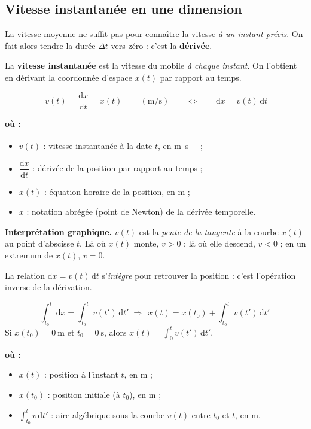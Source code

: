 \documentclass[11pt,a4paper]{article}
\newenvironment{ou}{%
  \par\smallskip\noindent\textbf{où :}\nopagebreak
  \begin{itemize}[leftmargin=1.8em,topsep=2pt,itemsep=1.5pt,parsep=0pt]}%
  {\end{itemize}}
\newcommand{\dd}{\mathrm{d}}
\newcommand{\ms}{\si{\metre\per\second}}
\begin{document}
\subsection{Vitesse instantanée en une dimension}

La vitesse moyenne ne suffit pas pour connaître la vitesse \emph{à un instant précis}.
On fait alors tendre la durée $\Delta t$ vers zéro : c'est la \textbf{dérivée}.

\begin{definition}
La \textbf{vitesse instantanée} est la vitesse du mobile \emph{à chaque instant}. On l'obtient
en dérivant la coordonnée d'espace $x(t)$ par rapport au temps.
\end{definition}

\begin{formule}
\[ \boxed{\,v(t)=\dfrac{\dd x}{\dd t}=\dot{x}(t)\,}\qquad(\ms)
   \qquad\Longleftrightarrow\qquad \dd x = v(t)\,\dd t \]
\begin{ou}
  \item $v(t)$ : vitesse instantanée à la date $t$, en \si{\metre\per\second} ;
  \item $\dfrac{\dd x}{\dd t}$ : dérivée de la position par rapport au temps ;
  \item $x(t)$ : équation horaire de la position, en \si{\metre} ;
  \item $\dot{x}$ : notation abrégée (point de Newton) de la dérivée temporelle.
\end{ou}
\end{formule}

\noindent\textbf{Interprétation graphique.} $v(t)$ est la \emph{pente de la tangente} à la courbe
$x(t)$ au point d'abscisse $t$. Là où $x(t)$ monte, $v>0$ ; là où elle descend, $v<0$ ;
en un extremum de $x(t)$, $v=0$.

\medskip
La relation $\dd x = v(t)\,\dd t$ s'\emph{intègre} pour retrouver la position : c'est l'opération inverse de la dérivation.

\begin{formule}
\[ \int_{t_0}^{t}\dd x=\int_{t_0}^{t} v(t')\,\dd t'
   \;\Longrightarrow\;
   \boxed{\,x(t)=x(t_0)+\int_{t_0}^{t} v(t')\,\dd t'\,}\tag{I} \]
Si $x(t_0)=\qty{0}{\metre}$ et $t_0=\qty{0}{\second}$, alors $\displaystyle x(t)=\int_{0}^{t} v(t')\,\dd t'$.
\begin{ou}
  \item $x(t)$ : position à l'instant $t$, en \si{\metre} ;
  \item $x(t_0)$ : position initiale (à $t_0$), en \si{\metre} ;
  \item $\displaystyle\int_{t_0}^{t} v\,\dd t'$ : aire algébrique sous la courbe $v(t)$ entre $t_0$ et $t$, en \si{\metre}.
\end{ou}
\end{formule}
\end{document}
